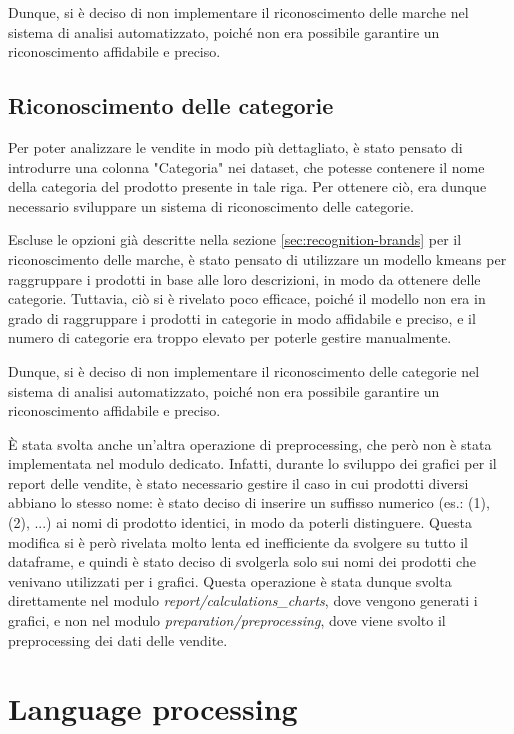Dunque, si è deciso di non implementare il riconoscimento delle marche nel sistema di analisi automatizzato, poiché non era possibile garantire un riconoscimento affidabile e preciso.


\subsection{Riconoscimento delle categorie}
\label{sec:recognition-categories}

Per poter analizzare le vendite in modo più dettagliato, è stato pensato di introdurre una colonna "Categoria" nei dataset, che potesse contenere il nome della categoria del prodotto presente in tale riga. Per ottenere ciò, era dunque necessario sviluppare un sistema di riconoscimento delle categorie.

Escluse le opzioni già descritte nella sezione \ref{sec:recognition-brands} per il riconoscimento delle marche, è stato pensato di utilizzare un modello \gls{kmeans}\glsfirstoccur{} per raggruppare i prodotti in base alle loro descrizioni, in modo da ottenere delle categorie. Tuttavia, ciò si è rivelato poco efficace, poiché il modello non era in grado di raggruppare i prodotti in categorie in modo affidabile e preciso, e il numero di categorie era troppo elevato per poterle gestire manualmente.

Dunque, si è deciso di non implementare il riconoscimento delle categorie nel sistema di analisi automatizzato, poiché non era possibile garantire un riconoscimento affidabile e preciso.


È stata svolta anche un'altra operazione di preprocessing, che però non è stata implementata nel modulo dedicato.
Infatti, durante lo sviluppo dei grafici per il report delle vendite, è stato necessario gestire il caso in cui prodotti diversi abbiano lo stesso nome: è stato deciso di inserire un suffisso numerico (es.: (1), (2), ...) ai nomi di prodotto identici, in modo da poterli distinguere. Questa modifica si è però rivelata molto lenta ed inefficiente da svolgere su tutto il dataframe, e quindi è stato deciso di svolgerla solo sui nomi dei prodotti che venivano utilizzati per i grafici.
Questa operazione è stata dunque svolta direttamente nel modulo \emph{report/calculations\_charts}, dove vengono generati i grafici, e non nel modulo \emph{preparation/preprocessing}, dove viene svolto il preprocessing dei dati delle vendite.



\section{Language processing}
\label{sec:language-processing}

